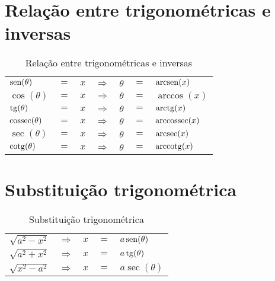 \section{Relação entre trigonométricas e inversas}
	\begin{table}[htb]
		\caption{Relação entre trigonométricas e inversas}
		\label{relacao_trigonometricas_inversas}
		\centering
		\begin{tabular}{|lclclcl|}
			$\operatorname{sen} (\theta)$    & $=$ & $x$ & $\Rightarrow$ & $\theta$ & $=$ & $\operatorname{arcsen} (x)$    \\
			$\cos (\theta)$    & $=$ & $x$ & $\Rightarrow$ & $\theta$ & $=$ & $\arccos (x)$    \\
			$\operatorname{tg} (\theta)$     & $=$ & $x$ & $\Rightarrow$ & $\theta$ & $=$ & $\operatorname{arctg} (x)$     \\
			$\operatorname{cossec} (\theta)$ & $=$ & $x$ & $\Rightarrow$ & $\theta$ & $=$ & $\operatorname{arccossec} (x)$ \\
			$\sec (\theta)$    & $=$ & $x$ & $\Rightarrow$ & $\theta$ & $=$ & $\operatorname{arcsec} (x)$    \\
			$\operatorname{cotg} (\theta)$   & $=$ & $x$ & $\Rightarrow$ & $\theta$ & $=$ & $\operatorname{arccotg} (x)$
		\end{tabular}		
	\end{table}

\section{Substituição trigonométrica}
	\begin{table}[htb]
		\caption{Substituição trigonométrica}
		\label{substituicao_trigonometrica}
		\centering
		\begin{tabular}{|lclcl|}
			$\sqrt{a^2 - x^2}$ & $\Rightarrow$ & $x$ & $=$ & $a\operatorname{sen} (\theta)$ \\
			$\sqrt{a^2 + x^2}$ & $\Rightarrow$ & $x$ & $=$ & $a\operatorname{tg} (\theta)$  \\
			$\sqrt{x^2 - a^2}$ & $\Rightarrow$ & $x$ & $=$ & $a\sec (\theta)$
		\end{tabular}		
	\end{table}

